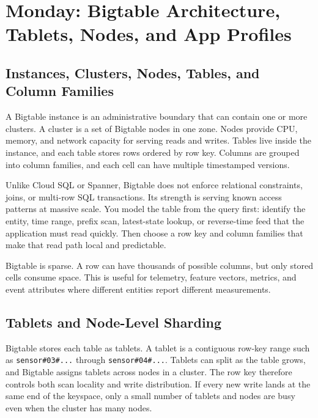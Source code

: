 \section{Monday: Bigtable Architecture, Tablets, Nodes, and App Profiles}

\subsection{Instances, Clusters, Nodes, Tables, and Column Families}
A Bigtable instance is an administrative boundary that can contain one or more clusters. A cluster is a set of Bigtable nodes in one zone. Nodes provide CPU, memory, and network capacity for serving reads and writes. Tables live inside the instance, and each table stores rows ordered by row key. Columns are grouped into column families, and each cell can have multiple timestamped versions.

Unlike Cloud SQL or Spanner, Bigtable does not enforce relational constraints, joins, or multi-row SQL transactions. Its strength is serving known access patterns at massive scale. You model the table from the query first: identify the entity, time range, prefix scan, latest-state lookup, or reverse-time feed that the application must read quickly. Then choose a row key and column families that make that read path local and predictable.

\begin{notebox}
Bigtable is sparse. A row can have thousands of possible columns, but only stored cells consume space. This is useful for telemetry, feature vectors, metrics, and event attributes where different entities report different measurements.
\end{notebox}

\subsection{Tablets and Node-Level Sharding}
Bigtable stores each table as tablets. A tablet is a contiguous row-key range such as \texttt{sensor\#03\#...} through \texttt{sensor\#04\#...}. Tablets can split as the table grows, and Bigtable assigns tablets across nodes in a cluster. The row key therefore controls both scan locality and write distribution. If every new write lands at the same end of the keyspace, only a small number of tablets and nodes are busy even when the cluster has many nodes.

